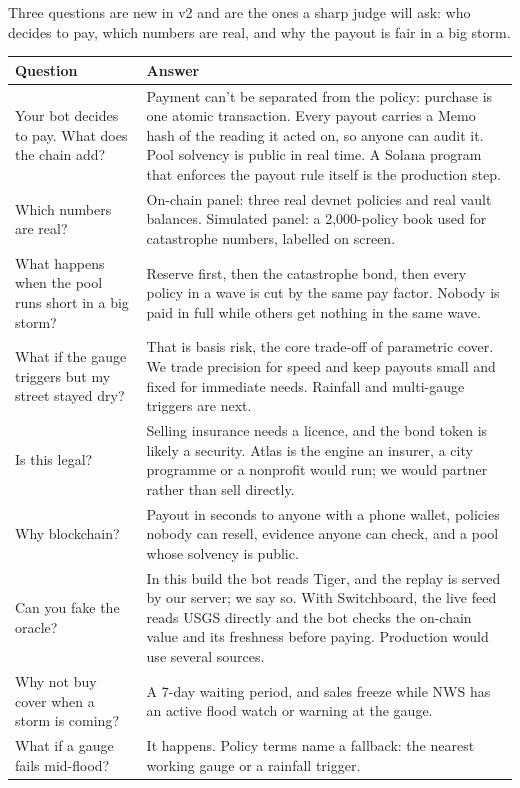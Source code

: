 \documentclass[11pt]{article}
\begin{document}
Three questions are new in v2 and are the ones a sharp judge will ask: who decides to pay, which numbers are real, and why the payout is fair in a big storm.

{\small
\begin{xltabular}{\linewidth}{@{}L{4.2cm} Y@{}}
\toprule
Question & Answer \\
\midrule
\endhead
Your bot decides to pay. What does the chain add? & Payment can't be separated from the policy: purchase is one atomic transaction. Every payout carries a Memo hash of the reading it acted on, so anyone can audit it. Pool solvency is public in real time. A Solana program that enforces the payout rule itself is the production step. \\
Which numbers are real? & On-chain panel: three real devnet policies and real vault balances. Simulated panel: a 2,000-policy book used for catastrophe numbers, labelled on screen. \\
What happens when the pool runs short in a big storm? & Reserve first, then the catastrophe bond, then every policy in a wave is cut by the same pay factor. Nobody is paid in full while others get nothing in the same wave. \\
What if the gauge triggers but my street stayed dry? & That is basis risk, the core trade-off of parametric cover. We trade precision for speed and keep payouts small and fixed for immediate needs. Rainfall and multi-gauge triggers are next. \\
Is this legal? & Selling insurance needs a licence, and the bond token is likely a security. Atlas is the engine an insurer, a city programme or a nonprofit would run; we would partner rather than sell directly. \\
Why blockchain? & Payout in seconds to anyone with a phone wallet, policies nobody can resell, evidence anyone can check, and a pool whose solvency is public. \\
Can you fake the oracle? & In this build the bot reads Tiger, and the replay is served by our server; we say so. With Switchboard, the live feed reads USGS directly and the bot checks the on-chain value and its freshness before paying. Production would use several sources. \\
Why not buy cover when a storm is coming? & A 7-day waiting period, and sales freeze while NWS has an active flood watch or warning at the gauge. \\
What if a gauge fails mid-flood? & It happens. Policy terms name a fallback: the nearest working gauge or a rainfall trigger. \\

\end{xltabular}}
\end{document}
